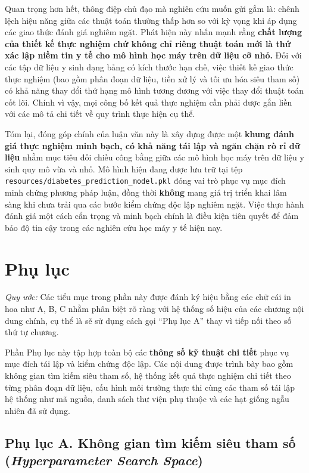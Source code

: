 \documentclass[14pt,a4paper]{extreport}
\begin{document}
Quan trọng hơn hết, thông điệp chủ đạo mà nghiên cứu muốn gửi gắm là: chênh lệch hiệu năng giữa các thuật toán thường thấp hơn so với kỳ vọng khi áp dụng các giao thức đánh giá nghiêm ngặt. Phát hiện này nhấn mạnh rằng \textbf{chất lượng của thiết kế thực nghiệm chứ không chỉ riêng thuật toán mới là thứ xác lập niềm tin y tế cho mô hình học máy trên dữ liệu cỡ nhỏ.} Đối với các tập dữ liệu y sinh dạng bảng có kích thước hạn chế, việc thiết kế giao thức thực nghiệm (bao gồm phân đoạn dữ liệu, tiền xử lý và tối ưu hóa siêu tham số) có khả năng thay đổi thứ hạng mô hình tương đương với việc thay đổi thuật toán cốt lõi. Chính vì vậy, mọi công bố kết quả thực nghiệm cần phải được gắn liền với các mô tả chi tiết về quy trình thực hiện cụ thể.

Tóm lại, đóng góp chính của luận văn này là xây dựng được một \textbf{khung đánh giá thực nghiệm minh bạch, có khả năng tái lập và ngăn chặn rò rỉ dữ liệu} nhằm mục tiêu đối chiếu công bằng giữa các mô hình học máy trên dữ liệu y sinh quy mô vừa và nhỏ. Mô hình hiện đang được lưu trữ tại tệp \texttt{resources/diabetes\_prediction\_model.pkl} đóng vai trò phục vụ mục đích minh chứng phương pháp luận, đồng thời \textbf{không} mang giá trị triển khai lâm sàng khi chưa trải qua các bước kiểm chứng độc lập nghiêm ngặt. Việc thực hành đánh giá một cách cẩn trọng và minh bạch chính là điều kiện tiên quyết để đảm bảo độ tin cậy trong các nghiên cứu học máy y tế hiện nay.

\appendix
\chapter*{Phụ lục}

\noindent\textit{Quy ước:} Các tiểu mục trong phần này được đánh ký hiệu bằng các chữ cái in hoa như A, B, C nhằm phân biệt rõ ràng với hệ thống số hiệu của các chương nội dung chính, cụ thể là sẽ sử dụng cách gọi ``Phụ lục A'' thay vì tiếp nối theo số thứ tự chương.

\noindent Phần Phụ lục này tập hợp toàn bộ các \textbf{thông số kỹ thuật chi tiết} phục vụ mục đích tái lập và kiểm chứng độc lập. Các nội dung được trình bày bao gồm không gian tìm kiếm siêu tham số, hệ thống kết quả thực nghiệm chi tiết theo từng phân đoạn dữ liệu, cấu hình môi trường thực thi cùng các tham số tái lập hệ thống như mã nguồn, danh sách thư viện phụ thuộc và các hạt giống ngẫu nhiên đã sử dụng.

\label{app:hyper}
\section*{Phụ lục A. Không gian tìm kiếm siêu tham số (\textit{Hyperparameter Search Space})}
\end{document}
